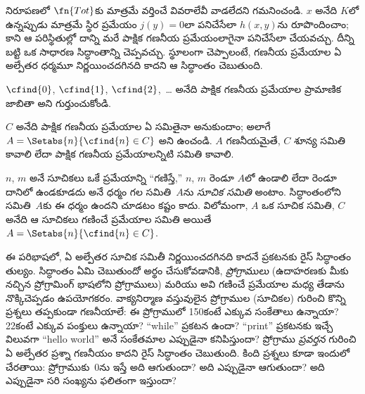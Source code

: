 \documentclass[../../../include/open-logic-section]{subfiles}
\begin{document}

 నిరూపణలో $\fn{Tot}$కు మాత్రమే వర్తించే
వివరాలేవీ వాడలేదని గమనించండి. $x$ అనేది $K$లో ఉన్నప్పుడు
మాత్రమే స్థిర ప్రమేయం $j(y)=0$లా పనిచేసేలా $h(x,y)$ను రూపొందించాం;
కాని ఆ పరిస్థితుల్లో దాన్ని మరే పాక్షిక గణనీయ ప్రమేయంలాగైనా పనిచేసేలా
చేయవచ్చు. దీన్ని బట్టి ఒక సాధారణ సిద్ధాంతాన్ని చెప్పవచ్చు. స్థూలంగా చెప్పాలంటే, గణనీయ ప్రమేయాల ఏ అల్పేతర
ధర్మమూ నిర్ణయించదగినది కాదని ఆ సిద్ధాంతం
చెబుతుంది.

$\cfind{0}$, $\cfind{1}$, $\cfind{2}$,~\dots{} అనేది పాక్షిక గణనీయ
ప్రమేయాల ప్రామాణిక జాబితా అని గుర్తుంచుకోండి.

\begin{thm}[రైస్ సిద్ధాంతం]
  $C$ అనేది పాక్షిక గణనీయ ప్రమేయాల ఏ సమితైనా అనుకుందాం; అలాగే
  $A=\Setabs{n}{\cfind{n}\in C}$ అని ఉంచండి. $A$ గణనీయమైతే, $C$
  శూన్య సమితి కావాలి లేదా పాక్షిక గణనీయ ప్రమేయాలన్నిటి సమితి కావాలి.
\end{thm}

$n$, $m$ అనే సూచికలు ఒకే ప్రమేయాన్ని ``గణిస్తే,'' $n$, $m$ రెండూ
$A$లో ఉండాలి లేదా రెండూ దానిలో ఉండకూడదు అనే ధర్మం గల సమితి~$A$ను
\emph{సూచిక సమితి} అంటాం. సిద్ధాంతంలోని సమితి~$A$కు ఈ ధర్మం ఉందని
చూడటం కష్టం కాదు. విలోమంగా, $A$ ఒక సూచిక సమితి, $C$ అనేది ఆ
సూచికలు గణించే ప్రమేయాల సమితి అయితే $A=\Setabs{n}{\cfind{n}\in C}$.

\begin{explain}
ఈ పరిభాషలో, ఏ అల్పేతర సూచిక సమితీ నిర్ణయించదగినది కాదనే ప్రకటనకు
రైస్ సిద్ధాంతం తుల్యం. సిద్ధాంతం ఏమి చెబుతుందో అర్థం చేసుకోవడానికి,
\emph{ప్రోగ్రాములు} (ఉదాహరణకు మీకు నచ్చిన ప్రోగ్రామింగ్ భాషలోని
ప్రోగ్రాములు) మరియు అవి గణించే ప్రమేయాల మధ్య తేడాను నొక్కిచెప్పడం
ఉపయోగకరం. వాక్యనిర్మాణ వస్తువులైన ప్రోగ్రాముల (సూచికల) గురించి కొన్ని
ప్రశ్నలు తప్పకుండా గణనీయాలే: ఈ ప్రోగ్రాములో 150కంటే ఎక్కువ సంకేతాలు
ఉన్నాయా? 22కంటే ఎక్కువ పంక్తులు ఉన్నాయా? ``while'' ప్రకటన ఉందా?
``print'' ప్రకటనకు ఇచ్చే విలువగా ``hello world'' అనే సంకేతమాల ఎప్పుడైనా
కనిపిస్తుందా? ప్రోగ్రాము \emph{ప్రవర్తన} గురించి ఏ అల్పేతర
ప్రశ్నా గణనీయం కాదని రైస్ సిద్ధాంతం చెబుతుంది. కింది ప్రశ్నలు కూడా
ఇందులో చేరతాయి: ప్రోగ్రాముకు~$0$ను ఇస్తే అది ఆగుతుందా? అది ఎప్పుడైనా
ఆగుతుందా? అది ఎప్పుడైనా సరి సంఖ్యను ఫలితంగా ఇస్తుందా?
\end{explain}
\end{document}
